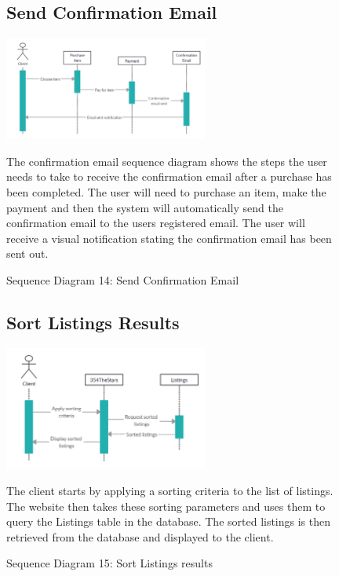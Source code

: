 \documentclass[11pt]{article}
\newcounter{use case ID}
\begin{document}
\begin{figure}[ht!]
    \subsection{Send Confirmation Email}
    \centering
    \includegraphics[width=0.6\textwidth,height=0.15\paperheight]{Diagrams/Sequence/Confirmation_Email.png} 
    \caption{Sequence Diagram 14: Send Confirmation Email}
    \label{fig: Send Confirmation Email}
    \begin{flushleft}
        The confirmation email sequence diagram shows the steps the user needs to take to receive the confirmation email after a purchase has been completed. The user will need to purchase an item, make the payment and then the system will automatically send the confirmation email to the users registered email. The user will receive a visual notification stating the confirmation email has been sent out.
    \end{flushleft}
\end{figure}

\begin{figure}[ht!]
    \subsection{Sort Listings Results}
    \centering
    \includegraphics[width=0.6\textwidth,height=0.2\paperheight]{Diagrams/Sequence/Sort_Listings.jpg} 
    \caption{Sequence Diagram 15: Sort Listings results}
    \label{fig: Sort Listings Results}
    \begin{flushleft}
        The client starts by applying a sorting criteria to the list of listings. The website then takes these sorting parameters and uses them to query the Listings table in the database. The sorted listings is then retrieved from the database and displayed to the client.
    \end{flushleft}
\end{figure}
\clearpage
\end{document}
